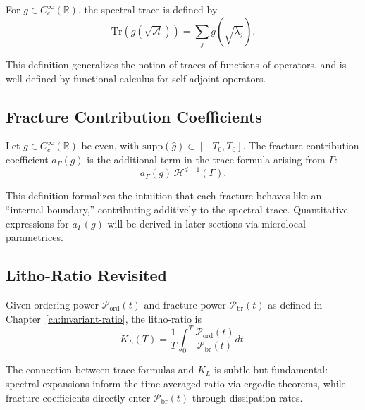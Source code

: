 \begin{definition}
For $g \in C_c^\infty(\mathbb{R})$, the spectral trace is defined by
\[
\mathrm{Tr}(g(\sqrt{\mathcal{A}})) = \sum_{j} g(\sqrt{\lambda_j}).
\]
\end{definition}

This definition generalizes the notion of traces of functions of operators, 
and is well-defined by functional calculus for self-adjoint operators. 

\subsection{Fracture Contribution Coefficients}

\begin{definition}
Let $g \in C_c^\infty(\mathbb{R})$ be even, with $\mathrm{supp}(\hat g) \subset [-T_0, T_0]$. 
The fracture contribution coefficient $a_\Gamma(g)$ is the additional term in the trace formula arising from $\Gamma$:
\[
a_\Gamma(g) \, \mathcal{H}^{d-1}(\Gamma).
\]
\end{definition}

\begin{remark}
This definition formalizes the intuition that each fracture behaves like an “internal boundary,” contributing additively to the spectral trace. Quantitative expressions for $a_\Gamma(g)$ will be derived in later sections via microlocal parametrices.
\end{remark}

\subsection{Litho-Ratio Revisited}

\begin{definition}
Given ordering power $\mathcal{P}_{\mathrm{ord}}(t)$ and fracture power $\mathcal{P}_{\mathrm{br}}(t)$ as defined in Chapter~\ref{ch:invariant-ratio}, the litho-ratio is
\[
K_L(T) = \frac{1}{T} \int_0^T \frac{\mathcal{P}_{\mathrm{ord}}(t)}{\mathcal{P}_{\mathrm{br}}(t)} dt.
\]
\end{definition}

\begin{remark}
The connection between trace formulas and $K_L$ is subtle but fundamental: spectral expansions inform the time-averaged ratio via ergodic theorems, while fracture coefficients directly enter $\mathcal{P}_{\mathrm{br}}(t)$ through dissipation rates.
\end{remark}

